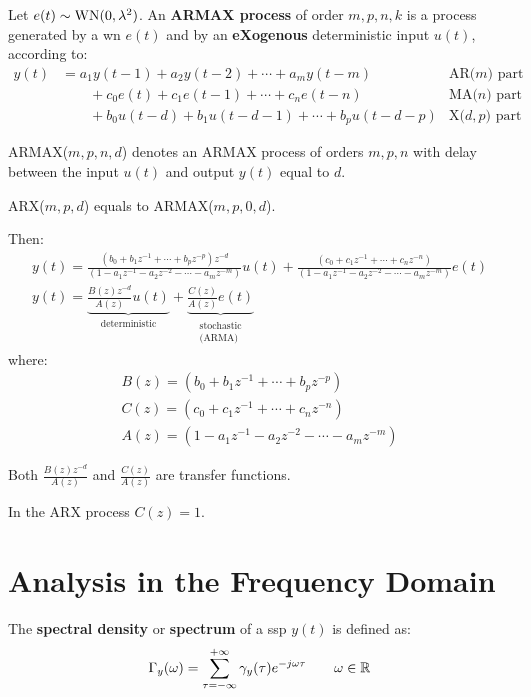 \begin{defn}
	Let $e(t) \sim \operatorname{WN}(0, \lambda^{2})$. An \textbf{ARMAX process} of order $m,p,n,k$ is a process generated by a \gls{wn} $e(t)$ and by an \textbf{eXogenous} deterministic input $u(t)$, according to:
	\begin{equation*}
	   \boxed{
		   \begin{aligned}
				y(t)&=a_{1} y(t-1)+a_{2} y(t-2)+\cdots+a_{m} y(t-m) &\text{AR($m$) part}\\
				&\qquad+c_{0} e(t)+c_{1} e(t-1)+\cdots+c_{n} e(t-n) &\text{MA($n$) part} \\
				&\qquad+b_{0} u(t-d)+b_{1} u(t-d-1)+\cdots+b_{p} u(t-d-p)  &\text{X($d,p$) part}
			\end{aligned}
		}
	\end{equation*}
\end{defn}

ARMAX($m,p,n,d$) denotes an ARMAX process of orders $m,p,n$ with delay between the input $u(t)$ and output $y(t)$ equal to $d$.

ARX($m,p,d$) equals to ARMAX($m,p,0,d$).

Then:
\begin{gather*}
	y(t) = \frac{(b_{0}+b_{1} z^{-1}+\cdots+b_{p} z^{-p}) z^{-d}}{(1-a_{1} z^{-1}-a_{2} z^{-2}-\cdots-a_{m} z^{-m})} u(t)
	+ \frac{(c_{0}+c_{1} z^{-1}+\cdots+c_{n} z^{-n})}{(1-a_{1} z^{-1}-a_{2} z^{-2}-\cdots-a_{m} z^{-m})} e(t) \\
	\boxed{
		y(t) =
		\underbrace{\frac{B(z) z^{-d}}{A(z)} u(t)}_{\text{deterministic}}
		+\underbrace{\frac{C(z)}{A(z)} e(t)}_{\substack{\text{stochastic}\\ \text{(ARMA)}}}
	}
\end{gather*}
where:
\begin{gather*}
	\boxed{B(z) = \left(b_{0}+b_{1} z^{-1}+\cdots+b_{p} z^{-p}\right)}\\
	\boxed{C(z) = \left(c_{0}+c_{1} z^{-1}+\cdots+c_{n} z^{-n}\right)}\\
	\boxed{A(z) = \left(1-a_{1} z^{-1}-a_{2} z^{-2}-\cdots-a_{m} z^{-m}\right)}
\end{gather*}

Both $\frac{B(z) z^{-d}}{A(z)}$ and $\frac{C(z)}{A(z)}$ are transfer functions.

In the ARX process $C(z)=1$.

\chapter{Analysis in the Frequency Domain}
\begin{defn}
	The \textbf{spectral density} or \textbf{spectrum} of a \gls{ssp} $y(t)$ is defined as:
	\[
		\Gamma_{y}(\omega)=\sum_{\tau=-\infty}^{+\infty} \gamma_{y}(\tau) e^{-j \omega \tau} \qquad \omega \in \mathbb{R}
	\]
\end{defn}

